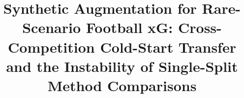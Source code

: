 \documentclass[conference,a4paper]{IEEEtran}
\begin{document}
\title{\large Synthetic Augmentation for Rare-Scenario Football xG: Cross-Competition Cold-Start Transfer and the Instability of Single-Split Method Comparisons}





\maketitle
\end{document}

